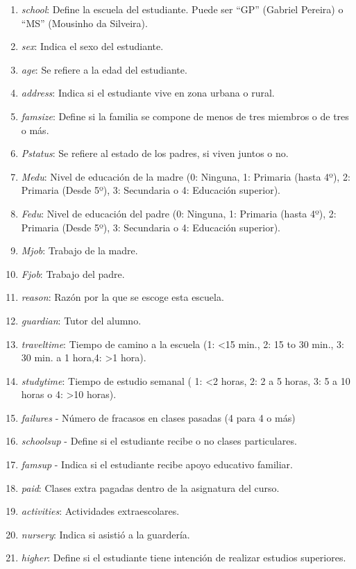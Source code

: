 \documentclass[12pt,a4paper]{article}
\begin{document}
\begin{enumerate}
	\item \textit{school}: Define la escuela del estudiante. Puede ser ``GP'' (Gabriel Pereira) o ``MS'' (Mousinho da Silveira).
	\item \textit{sex}: Indica el sexo del estudiante.
	\item \textit{age}: Se refiere a la edad del estudiante.
	\item \textit{address}: Indica si el estudiante vive en zona urbana o rural.
	\item \textit{famsize}: Define si la familia se compone de menos de tres miembros o de tres o más.
	\item \textit{Pstatus}: Se refiere al estado de los padres, si viven juntos o no.
	\item \textit{Medu}: Nivel de educación de la madre (0: Ninguna, 1: Primaria (hasta 4º), 2: Primaria (Desde 5º), 3: Secundaria o  4: Educación superior).
	\item \textit{Fedu}: Nivel de educación del padre (0: Ninguna, 1: Primaria (hasta 4º), 2: Primaria (Desde 5º), 3: Secundaria o  4: Educación superior).
	\item \textit{Mjob}:  Trabajo de la madre.
	\item \textit{Fjob}: Trabajo del padre.
	\item \textit{reason}: Razón por la que se escoge esta escuela.
	\item \textit{guardian}: Tutor del alumno.
	\item \textit{traveltime}: Tiempo de camino a la escuela  (1: <15 min., 2: 15 to 30 min., 3: 30 min. a 1 hora,4: >1 hora).
	\item \textit{studytime}: Tiempo de estudio semanal ( 1: <2 horas, 2: 2 a 5 horas, 3: 5 a 10 horas o  4: >10 horas).
	\item \textit{failures} - Número de fracasos en clases pasadas (4 para 4 o más)
	\item \textit{schoolsup} - Define si el estudiante recibe o no clases particulares. 
	\item \textit{famsup} - Indica si el estudiante recibe apoyo educativo familiar.
	\item \textit{paid}: Clases extra pagadas dentro de la asignatura del curso. 
	\item \textit{activities}: Actividades extraescolares.
	\item \textit{nursery}: Indica si asistió a la guardería. 
	\item \textit{higher}: Define si el estudiante tiene intención de  realizar estudios superiores.

\end{enumerate}
\end{document}
